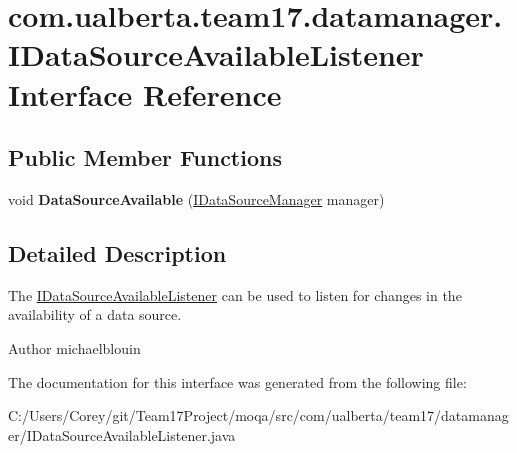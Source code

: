 \hypertarget{interfacecom_1_1ualberta_1_1team17_1_1datamanager_1_1_i_data_source_available_listener}{\section{com.\+ualberta.\+team17.\+datamanager.\+I\+Data\+Source\+Available\+Listener Interface Reference}
\label{interfacecom_1_1ualberta_1_1team17_1_1datamanager_1_1_i_data_source_available_listener}
}
\subsection*{Public Member Functions}
\begin{DoxyCompactItemize}
\item 
\hypertarget{interfacecom_1_1ualberta_1_1team17_1_1datamanager_1_1_i_data_source_available_listener_a65b9c9bf29f0b841774067fbfd02f2c6}{void {\bfseries Data\+Source\+Available} (\hyperlink{interfacecom_1_1ualberta_1_1team17_1_1datamanager_1_1_i_data_source_manager}{I\+Data\+Source\+Manager} manager)}\label{interfacecom_1_1ualberta_1_1team17_1_1datamanager_1_1_i_data_source_available_listener_a65b9c9bf29f0b841774067fbfd02f2c6}

\end{DoxyCompactItemize}


\subsection{Detailed Description}
The \hyperlink{interfacecom_1_1ualberta_1_1team17_1_1datamanager_1_1_i_data_source_available_listener}{I\+Data\+Source\+Available\+Listener} can be used to listen for changes in the availability of a data source.

\begin{DoxyAuthor}{Author}
michaelblouin 
\end{DoxyAuthor}


The documentation for this interface was generated from the following file\+:\begin{DoxyCompactItemize}
\item 
C\+:/\+Users/\+Corey/git/\+Team17\+Project/moqa/src/com/ualberta/team17/datamanager/I\+Data\+Source\+Available\+Listener.\+java\end{DoxyCompactItemize}
